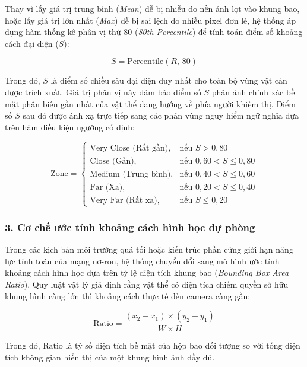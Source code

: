 Thay vì lấy giá trị trung bình (\textit{Mean}) dễ bị nhiễu do nền ảnh lọt vào khung bao, hoặc lấy giá trị lớn nhất (\textit{Max}) dễ bị sai lệch do nhiễu pixel đơn lẻ, hệ thống áp dụng hàm thống kê phân vị thứ 80 (\textit{80th Percentile}) để tính toán điểm số khoảng cách đại diện ($S$):

\begin{equation}
    S = \text{Percentile}(R, \, 80)
\end{equation}

Trong đó, $S$ là điểm số chiều sâu đại diện duy nhất cho toàn bộ vùng vật cản được trích xuất. Giá trị phân vị này đảm bảo điểm số $S$ phản ánh chính xác bề mặt phân biên gần nhất của vật thể đang hướng về phía người khiếm thị. Điểm số $S$ sau đó được ánh xạ trực tiếp sang các phân vùng nguy hiểm ngữ nghĩa dựa trên hàm điều kiện ngưỡng cố định:

\begin{equation}
    \text{Zone} = \begin{cases} 
        \text{Very Close (Rất gần)}, & \text{nếu } S > 0,80 \\
        \text{Close (Gần)}, & \text{nếu } 0,60 < S \le 0,80 \\
        \text{Medium (Trung bình)}, & \text{nếu } 0,40 < S \le 0,60 \\
        \text{Far (Xa)}, & \text{nếu } 0,20 < S \le 0,40 \\
        \text{Very Far (Rất xa)}, & \text{nếu } S \le 0,20
    \end{cases}
\end{equation}

\subsubsection*{3. Cơ chế ước tính khoảng cách hình học dự phòng}

Trong các kịch bản môi trường quá tối hoặc kiến trúc phần cứng giới hạn năng lực tính toán của mạng nơ-ron, hệ thống chuyển đổi sang mô hình ước tính khoảng cách hình học dựa trên tỷ lệ diện tích khung bao (\textit{Bounding Box Area Ratio}). Quy luật vật lý giả định rằng vật thể có diện tích chiếm quyền sở hữu khung hình càng lớn thì khoảng cách thực tế đến camera càng gần:

\begin{equation}
    \text{Ratio} = \frac{(x_2 - x_1) \times (y_2 - y_1)}{W \times H}
\end{equation}

Trong đó, $\text{Ratio}$ là tỷ số diện tích bề mặt của hộp bao đối tượng so với tổng diện tích không gian hiển thị của một khung hình ảnh đầy đủ.

